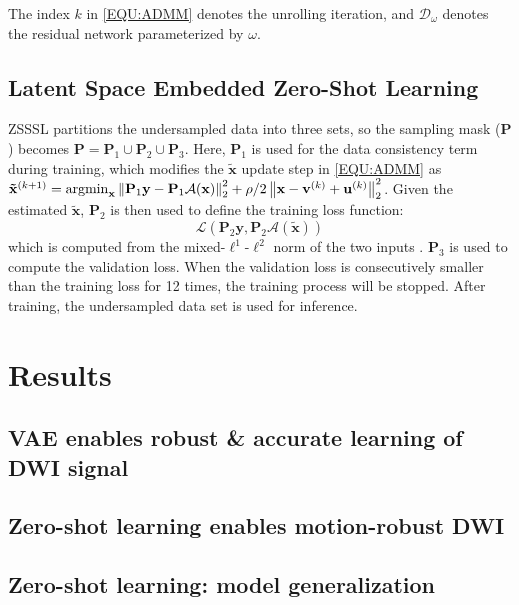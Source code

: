 \documentclass[journal,twoside,web]{ieeecolor}
\newcommand{\argmin}{\operatornamewithlimits{argmin}}
\newcommand{\norm}[1]{\left\lVert#1\right\rVert}
\begin{document}
    The index $k$ in \cref{EQU:ADMM} denotes the unrolling iteration,
    and $\mathcal{D}_{\omega}$ denotes the residual network
    parameterized by $\omega$.

	\subsection{Latent Space Embedded Zero-Shot Learning}

    ZSSSL partitions the undersampled data into three sets,
    so the sampling mask ($\mathbf{P}$) becomes
    $\mathbf{P} = \mathbf{P}_1 \cup \mathbf{P}_2 \cup \mathbf{P}_3$.
    Here, $\mathbf{P}_1$ is used for the data consistency term
    during training,
    which modifies the $\mathbf{\tilde{x}}$ update step
    in \cref{EQU:ADMM} as
    $\mathbf{\tilde{x}}^{(k+1)} = \argmin_{\mathbf{x}} \norm{\mathbf{P}_1 \mathbf{y} - \mathbf{P}_1 \mathcal{A}(\mathbf{x})}_2^2 + \rho/2 \norm{ \mathbf{x} - \mathbf{v}^{(k)} + \mathbf{u}^{(k)}}_2^2$.
    Given the estimated $\mathbf{\tilde{x}}$,
    $\mathbf{P}_2$ is then used to define the training loss function:
    \begin{equation}
        \label{EQU:LOSS}
        \mathcal{L}(\mathbf{P}_2 \mathbf{y}, \mathbf{P}_2 \mathcal{A}(\mathbf{\tilde{x}}))
    \end{equation}
    which is computed from
    the mixed-$\ell^1$-$\ell^2$ norm of the two inputs
    \cite{yaman_2020_ssdu}.
    $\mathbf{P}_3$ is used to compute the validation loss.
    When the validation loss is consecutively smaller than
    the training loss for 12 times,
    the training process will be stopped.
    After training, the undersampled data set is used for inference.



	\section{Results}

	\subsection{VAE enables robust \& accurate learning of DWI signal}

	\subsection{Zero-shot learning enables motion-robust DWI}

	\subsection{Zero-shot learning: model generalization}
\end{document}
